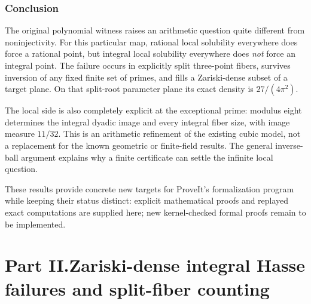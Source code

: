 \documentclass[11pt]{article}
\numberwithin{equation}{section}
\theoremstyle{plain}
\theoremstyle{plain}
\theoremstyle{plain}
\theoremstyle{definition}
\theoremstyle{definition}
\theoremstyle{definition}
\theoremstyle{remark}
\begin{document}
\section{Conclusion}
The original polynomial witness raises an arithmetic question quite
different from noninjectivity. For this particular map, rational local
solubility everywhere does force a rational point, but integral local
solubility everywhere does \emph{not} force an integral point. The failure
occurs in explicitly split three-point fibers, survives inversion of any
fixed finite set of primes, and fills a Zariski-dense subset of a target
plane. On that split-root parameter plane its exact density is
$27/(4\pi^2)$.

The local side is also completely explicit at the exceptional prime:
modulus eight determines the integral dyadic image and every integral
fiber size, with image measure $11/32$. This is an arithmetic refinement
of the existing cubic model, not a replacement for the known geometric
or finite-field results. The general inverse-ball argument explains why
a finite certificate can settle the infinite local question.

These results provide concrete new targets for ProveIt's formalization
program while keeping their status distinct: explicit mathematical
proofs and replayed exact computations are supplied here; new
kernel-checked formal proofs remain to be implemented.

\clearpage
{}\part*{Part II.\quad Zariski-dense integral Hasse failures and split-fiber counting}
\end{document}
